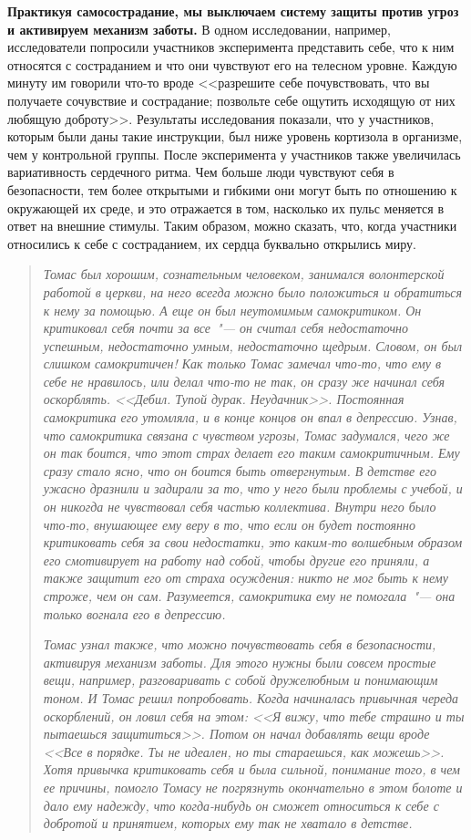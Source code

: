 \textbf{Практикуя самосострадание, мы выключаем систему защиты против угроз и активируем механизм заботы.} В одном исследовании, например, исследователи попросили участников эксперимента представить себе, что к ним относятся с состраданием и что они чувствуют его на телесном уровне. Каждую минуту им говорили что-то вроде <<разрешите себе почувствовать, что вы получаете сочувствие и сострадание; позвольте себе ощутить исходящую от них любящую доброту>>. Результаты исследования показали, что у участников, которым были даны такие инструкции, был ниже уровень кортизола в организме, чем у контрольной группы. После эксперимента у участников также увеличилась вариативность сердечного ритма. Чем больше люди чувствуют себя в безопасности, тем более открытыми и гибкими они могут быть по отношению к окружающей их среде, и это отражается в том, насколько их пульс меняется в ответ на внешние стимулы. Таким образом, можно сказать, что, когда участники относились к себе с состраданием, их сердца буквально открылись миру.

\vspace{4ex}

\begin{quotation}
	\textit{Томас был хорошим, сознательным человеком, занимался волонтерской работой в церкви, на него всегда можно было положиться и обратиться к нему за помощью. А еще он был неутомимым самокритиком. Он критиковал себя почти за все~"--- он считал себя недостаточно успешным, недостаточно умным, недостаточно щедрым. Словом, он был слишком самокритичен! Как только Томас замечал что-то, что ему в себе не нравилось, или делал что-то не так, он сразу же начинал себя оскорблять. <<Дебил. Тупой дурак. Неудачник>>. Постоянная самокритика его утомляла, и в конце концов он впал в депрессию. Узнав, что самокритика связана с чувством угрозы, Томас задумался, чего же он так боится, что этот страх делает его таким самокритичным. Ему сразу стало ясно, что он боится быть отвергнутым. В детстве его ужасно дразнили и задирали за то, что у него были проблемы с учебой, и он никогда не чувствовал себя частью коллектива. Внутри него было что-то, внушающее ему веру в то, что если он будет постоянно критиковать себя за свои недостатки, это каким-то волшебным образом его смотивирует на работу над собой, чтобы другие его приняли, а также защитит его от страха осуждения: никто не мог быть к нему строже, чем он сам. Разумеется, самокритика ему не помогала~"--- она только вогнала его в депрессию.}
	
	\textit{Томас узнал также, что можно почувствовать себя в безопасности, активируя механизм заботы. Для этого нужны были совсем простые вещи, например, разговаривать с собой дружелюбным и понимающим тоном. И Томас решил попробовать. Когда начиналась привычная череда оскорблений, он ловил себя на этом: <<Я вижу, что тебе страшно и ты пытаешься защититься>>. Потом он начал добавлять вещи вроде <<Все в порядке. Ты не идеален, но ты стараешься, как можешь>>. Хотя привычка критиковать себя и была сильной, понимание того, в чем ее причины, помогло Томасу не погрязнуть окончательно в этом болоте и дало ему надежду, что когда-нибудь он сможет относиться к себе с добротой и принятием, которых ему так не хватало в детстве.}
\end{quotation}

